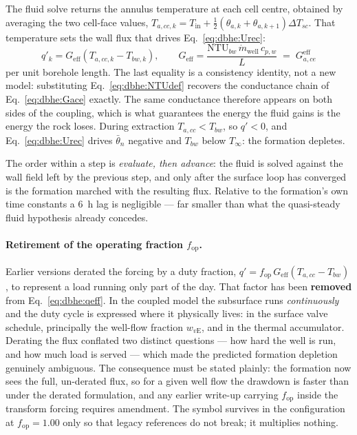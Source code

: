 \documentclass[11pt]{article}
\begin{document}
The fluid solve returns the annulus temperature at each cell centre, obtained by
averaging the two cell-face values,
$T_{a,cc,k}=T_{\mathrm{in}}+\tfrac12(\theta_{a,k}+\theta_{a,k+1})\Delta T_{sc}$.
That temperature sets the wall flux that drives Eq.~\eqref{eq:dbhe:Urec}:
\begin{equation}
\boxed{\; q'_k=G_{\mathrm{eff}}\left(T_{a,cc,k}-T_{bw,k}\right), \qquad
G_{\mathrm{eff}}=\frac{\mathrm{NTU}_{bw}\,\dot m_{\mathrm{well}}\,c_{p,w}}{L}
\;=\;G_{a,ce}^{\mathrm{eff}} \; }
\label{eq:dbhe:qeff}
\end{equation}
per unit borehole length. The last equality is a consistency identity, not a new
model: substituting Eq.~\eqref{eq:dbhe:NTUdef} recovers the conductance chain
of Eq.~\eqref{eq:dbhe:Gace} exactly. The same conductance therefore appears on
both sides of the coupling, which is what guarantees the energy the fluid gains
is the energy the rock loses. During extraction $T_{a,cc}<T_{bw}$, so $q'<0$,
and Eq.~\eqref{eq:dbhe:Urec} drives $\bar\theta_n$ negative and $T_{bw}$ below
$T_\infty$: the formation depletes.

The order within a step is \emph{evaluate, then advance}: the fluid is solved
against the wall field left by the previous step, and only after the surface
loop has converged is the formation marched with the resulting flux. Relative to
the formation's own time constants a \SI{6}{\hour} lag is negligible --- far
smaller than what the quasi-steady fluid hypothesis already concedes.

\paragraph{Retirement of the operating fraction $f_{\mathrm{op}}$.}
Earlier versions derated the forcing by a duty fraction,
$q'=f_{\mathrm{op}}\,G_{\mathrm{eff}}(T_{a,cc}-T_{bw})$, to represent a load
running only part of the day. That factor has been \textbf{removed} from
Eq.~\eqref{eq:dbhe:qeff}. In the coupled model the subsurface runs
\emph{continuously} and the duty cycle is expressed where it physically lives:
in the surface valve schedule, principally the well-flow fraction
$w_{v\mathrm{E}}$, and in the thermal accumulator. Derating the flux conflated
two distinct questions --- how hard the well is run, and how much load is served
--- which made the predicted formation depletion genuinely ambiguous. The
consequence must be stated plainly: the formation now sees the full, un-derated
flux, so for a given well flow the drawdown is faster than under the derated
formulation, and any earlier write-up carrying $f_{\mathrm{op}}$ inside the
transform forcing requires amendment. The symbol survives in the configuration
at $f_{\mathrm{op}}=1.00$ only so that legacy references do not break; it
multiplies nothing.
\end{document}
